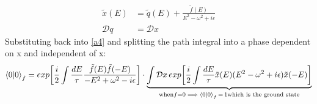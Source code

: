 \documentclass{article}
\begin{document}
\begin{align}
	\tilde{x}(E) &= \tilde{q}(E) + \frac{ \tilde{f}(E) }{E^2 - \omega^2 + i\epsilon } \\
	\mathcal{D}q &= \mathcal{D}x
\end{align}
Substituting back into \ref{a4} and splitting the path integral into a phase dependent on x and independent of x:
\begin{align}
	\braket{0}{0}_f = exp \bigg[ \frac{i}{2} \int \frac{dE}{\tau} \frac{ \tilde{f}(E) \tilde{f}(-E) }{-E^2+\omega^2-i\epsilon} \bigg] \cdot \underbrace{ \int \mathcal{D}x\, exp \bigg[ \frac{i}{2} \int \frac{dE}{\tau} \tilde{x}(E) (E^2 - \omega^2 +i\epsilon) \tilde{x}(-E) \bigg] }_{\text{when} f=0 \implies \braket{0}{0}_f	\, = \, 1 \text{which is the ground state}}
\end{align}
\end{document}

